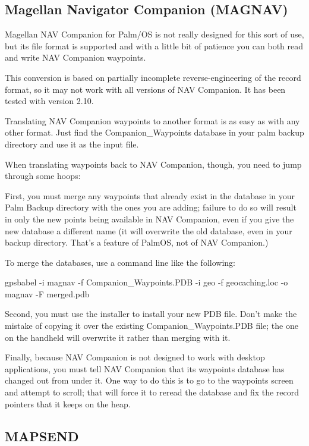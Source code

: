 \documentclass[12pt]{article}
\begin{document}
\subsection{Magellan Navigator Companion (MAGNAV)}

Magellan NAV Companion for Palm/OS is not really designed for this 
sort of use, but its file format is supported and with a little bit
of patience you can both read and write NAV Companion waypoints.

This conversion is based on partially
incomplete reverse-engineering of the record format, so it may not
work with all versions of NAV Companion.  It has been tested with 
version 2.10.

Translating NAV Companion waypoints to another format is as easy
as with any other format.  Just find the Companion\_Waypoints database
in your palm backup directory and use it as the input file. 

When translating waypoints back to NAV Companion, though, you need 
to jump through some hoops:  

First, you must merge any waypoints that already exist in the database 
in your Palm Backup directory with the ones you are adding; failure to 
do so will result in only the new points being available in NAV Companion, 
even if you give the new database a different name (it will overwrite 
the old database, even in your backup directory.  That's a feature of 
PalmOS, not of NAV Companion.)  

To merge the databases, use a command line like the following:

gpsbabel -i magnav -f Companion\_Waypoints.PDB -i geo -f geocaching.loc -o magnav -F merged.pdb

Second, you must use the installer to install your new PDB file.  Don't
make the mistake of copying it over the existing Companion\_Waypoints.PDB
file; the one on the handheld will overwrite it rather than merging with
it.

Finally, because NAV Companion is not designed to work with desktop 
applications, you must tell NAV Companion that its waypoints database 
has changed out from under it.  One way to do this is to go to the 
waypoints screen and attempt to scroll; that will force it to reread 
the database and fix the record pointers that it keeps on the heap.


	
\subsection{MAPSEND}
\end{document}
